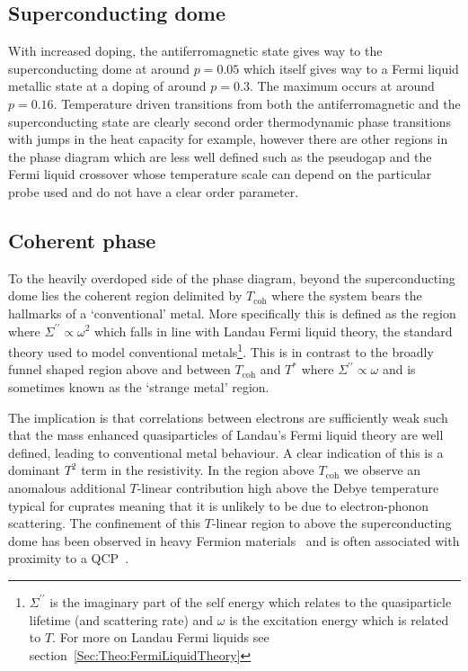 \subsection{Superconducting dome}

With increased doping, the antiferromagnetic state gives way to the superconducting dome at around $p=0.05$ which itself gives way to a Fermi liquid metallic state at a doping of around $p=0.3$. The maximum \Tc occurs at around $p=0.16$. Temperature driven transitions from both the antiferromagnetic and the superconducting state are clearly second order thermodynamic phase transitions with jumps in the heat capacity for example, however there are other regions in the phase diagram which are less well defined such as the pseudogap and the Fermi liquid crossover whose temperature scale can depend on the particular probe used and do not have a clear order parameter.

\subsection{Coherent phase}

To the heavily overdoped side of the phase diagram, beyond the superconducting dome lies the coherent region delimited by $T_{\textrm{coh}}$ where the system bears the hallmarks of a `conventional' metal. More specifically this is defined as the region where $\Sigma^{\prime\prime} \propto \omega^2$ which falls in line with Landau Fermi liquid theory, the standard theory used to model conventional metals\footnote{$\Sigma^{\prime\prime}$ is the imaginary part of the self energy which relates to the quasiparticle lifetime (and scattering rate) and $\omega$ is the excitation energy which is related to $T$. For more on Landau Fermi liquids see section~\ref{Sec:Theo:FermiLiquidTheory}}. This is in contrast to the broadly funnel shaped region above and between $T_{\textrm{coh}}$ and $T^*$ where $\Sigma^{\prime\prime} \propto \omega$ and is sometimes known as the `strange metal' region.

 The implication is that correlations between electrons are sufficiently weak such that the mass enhanced quasiparticles of Landau's Fermi liquid theory are well defined, leading to conventional metal behaviour. A clear indication of this is a dominant $T^2$ term in the resistivity. In the region above $T_{\textrm{coh}}$ we observe an anomalous additional $T$-linear contribution high above the Debye temperature typical for cuprates meaning that it is unlikely to be due to electron-phonon scattering. The confinement of this $T$-linear region to above the superconducting dome has been observed in heavy Fermion materials~\cite{Custers2003} and is often associated with proximity to a \ac{QCP}~\cite{Hussey2008}.

